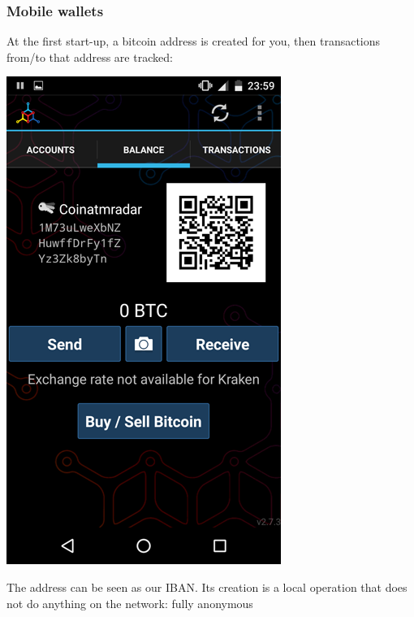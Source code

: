 \documentclass[11pt]{beamer}  %
\begin{document}
\begin{frame}\frametitle{Mobile wallets}

  At the first start-up, a bitcoin address is created for you, then transactions
  from/to that address are tracked:

  \begin{center}
    \includegraphics[scale=0.27,clip=false]{pictures/bitcoin-wallet.png}
  \end{center}

  The \alert{address} can be seen as our IBAN. Its creation
  is a local operation that does not do anything on the network: fully anonymous

\end{frame}
\end{document}
